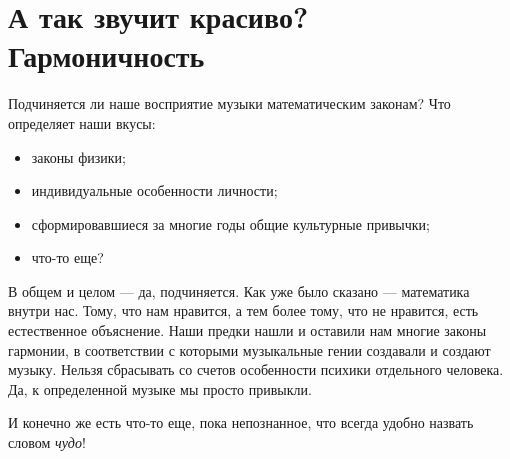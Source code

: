 \chapter{А так звучит красиво? Гармоничность}
\label{ch:harmony}


Подчиняется ли наше восприятие музыки математическим законам? Что определяет наши вкусы:
\begin{itemize}
    \item законы физики;
    \item индивидуальные особенности личности;
    \item сформировавшиеся за многие годы общие культурные привычки;
    \item что-то еще?
\end{itemize}

В общем и целом --- да, подчиняется. Как уже было сказано --- математика внутри нас. Тому, что нам нравится, а тем более тому, что не нравится, есть естественное объяснение. Наши предки нашли и оставили нам многие законы гармонии, в соответствии с которыми музыкальные гении создавали и создают музыку. Нельзя сбрасывать со счетов особенности психики отдельного человека. Да, к определенной музыке мы просто привыкли.

И конечно же есть что-то еще, пока непознанное, что всегда удобно назвать словом \emph{чудо}!


%
%
%
%

